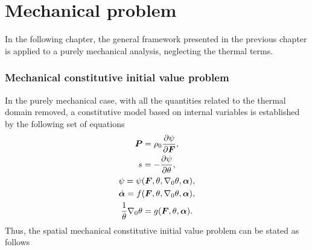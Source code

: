 \chapter{Mechanical problem}

In the following chapter, the general framework presented in the previous chapter is applied to a purely mechanical analysis, neglecting the thermal terms.

\subsection{Mechanical constitutive initial value problem}

In the purely mechanical case, with all the quantities related to the thermal domain removed, a constitutive model based on internal variables is established by the following set of equations
    \begin{gather}
        \bm{P} = \rho_0 \frac{\partial \psi}{\partial \bm{F}},\\
        s = - \frac{\partial \psi}{\partial \theta},\\
        \psi = \psi(\bm{F},\theta, \nabla_0 \theta,\bm{\alpha}),\\
        \dot{\bm{\alpha}} = f(\bm{F}, \theta, \nabla_0 \theta,\bm{\alpha}),\\
        \frac{1}{\theta}\nabla_0 \theta = g(\bm F, \theta, \bm \alpha).
    \end{gather}
  Thus, the spatial mechanical constitutive initial value problem can be stated as follows

